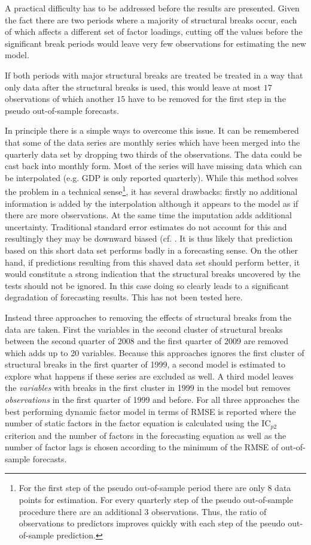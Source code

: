 \documentclass[11pt]{article}
\begin{document}
A practical difficulty has to be addressed before the results are presented. Given the fact there are two periods where a majority of structural breaks occur, each of which affects a different set of factor loadings, cutting off the values before the significant break periods would leave very few observations for estimating the new model.

If both periods with major structural breaks are treated be treated in a way that only data after the structural breaks is used, this would leave at most $17$ observations of which another $15$ have to be removed for the first step in the pseudo out-of-sample forecasts.

In principle there is a simple ways to overcome this issue. It can be remembered that some of the data series are monthly series which have been merged into the quarterly data set by dropping two thirds of the observations. The data could be cast back into monthly form. Most of the series will have missing data which can be interpolated (e.g. GDP is only reported quarterly). While this method solves the problem in a technical sense\footnote{For the first step of the pseudo out-of-sample period there are only $8$ data points for estimation. For every quarterly step of the pseudo out-of-sample procedure there are an additional $3$ observations. Thus, the ratio of observations to predictors improves quickly with each step of the pseudo out-of-sample prediction.}, it has several drawbacks: firstly no additional information is added by the interpolation  although it appears to the model as if there are more observations. At the same time the imputation adds additional uncertainty. Traditional standard error estimates do not account for this and resultingly they may be downward biased (cf. \citet[chapter~25]{gelman2006missing}. It is thus likely that prediction based on this short data set performs badly in a forecasting sense. On the other hand, if predictions resulting from this shaved data set should perform better, it would constitute a strong indication that the structural breaks uncovered by the tests should not be ignored. In this case doing so clearly leads to a significant degradation of forecasting results. This has not been tested here. 

Instead three approaches to removing the effects of structural breaks from the data are taken. First the variables in the second cluster of structural breaks between the second quarter of 2008 and the first quarter of 2009 are removed which adds up to 20 variables. 
Because this approaches ignores the first cluster of structural breaks in the first quarter of 1999, a second model is estimated to explore what happens if these series are excluded as well. A third model leaves the \textit{variables} with breaks in the first cluster in 1999 in the model but removes \textit{observations} in the first quarter of 1999 and before. For all three approaches the best performing dynamic factor model in terms of RMSE is reported where the number of static factors in the factor equation is calculated using the IC$_{p2}$ criterion and the number of factors in the forecasting equation as well as the number of factor lags is chosen according to the minimum of the RMSE of out-of-sample forecasts.
\end{document}
